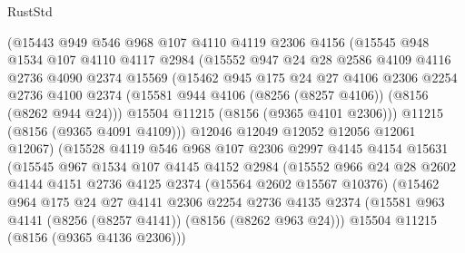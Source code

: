 \begin{lexlean}{RustStd}
\begin{coremodule}
              (@15443
                @949
                @546
                @968
                @107
                @4110
                @4119
                @2306
                @4156
                (@15545
                  @948
                  @1534
                  @107
                  @4110
                  @4117
                  @2984
                  (@15552
                    @947
                    @24
                    @28
                    @2586
                    @4109
                    @4116
                    @2736
                    @4090
                    @2374
                    @15569
                    (@15462
                      @945
                      @175
                      @24
                      @27
                      @4106
                      @2306
                      @2254
                      @2736
                      @4100
                      @2374
                      (@15581 @944 @4106 (@8256 (@8257 @4106)) (@8156 (@8262 @944 @24)))
                      @15504
                      @11215
                      (@8156 (@9365 @4101 @2306)))
                    @11215
                    (@8156 (@9365 @4091 @4109)))
                  @12046
                  @12049
                  @12052
                  @12056
                  @12061
                  @12067)
                (@15528
                  @4119
                  @546
                  @968
                  @107
                  @2306
                  @2997
                  @4145
                  @4154
                  @15631
                  (@15545
                    @967
                    @1534
                    @107
                    @4145
                    @4152
                    @2984
                    (@15552
                      @966
                      @24
                      @28
                      @2602
                      @4144
                      @4151
                      @2736
                      @4125
                      @2374
                      (@15564 @2602 @15567 @10376)
                      (@15462
                        @964
                        @175
                        @24
                        @27
                        @4141
                        @2306
                        @2254
                        @2736
                        @4135
                        @2374
                        (@15581 @963 @4141 (@8256 (@8257 @4141)) (@8156 (@8262 @963 @24)))
                        @15504
                        @11215
                        (@8156 (@9365 @4136 @2306)))

\end{coremodule}
\end{lexlean}
